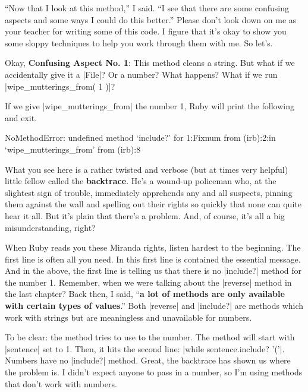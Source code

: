 \documentclass[12pt,twoside]{report}
\begin{document}
``Now that I look at this method,'' I said.  ``I see that there are
some confusing aspects and some ways I could do this better.''  Please
don't look down on me as your teacher for writing some of this code.
I figure that it's okay to show you some sloppy techniques to help you
work through them with me.  So let's.

Okay, {\bf Confusing Aspect No. 1}: This method cleans a string.  But
what if we accidentally give it a \rubyinline|File|?
Or a number?  What happens?  What if we run
\rubyinline|wipe_mutterings_from( 1 )|?

If we give \rubyinline|wipe_mutterings_from| the
number 1, Ruby will print the following and exit.


\begin{consolecode}

 NoMethodError: undefined method `include?' for 1:Fixnum
         from (irb):2:in `wipe_mutterings_from'
         from (irb):8

\end{consolecode}


What you see here is a rather twisted and verbose (but at times very
helpful) little fellow called the {\bf backtrace}.  He's a wound-up
policeman who, at the slightest sign of trouble, immediately
apprehends any and all suspects, pinning them against the wall and
spelling out their rights so quickly that none can quite hear it all.
But it's plain that there's a problem.  And, of course, it's all a big
misunderstanding, right?

When Ruby reads you these Miranda rights, listen hardest to the
beginning.  The first line is often all you need.  In this first line
is contained the essential message.  And in the above, the first line
is telling us that there is no \rubyinline|include?|
method for the number 1. Remember, when we were talking about the
\rubyinline|reverse| method in the last chapter?  Back
then, I said, ``{\bf a lot of methods are only available with certain
  types of values}.''  Both \rubyinline|reverse| and
\rubyinline|include?| are methods which work with
strings but are meaningless and unavailable for numbers.

To be clear: the method tries to use to the number.  The method will
start with \rubyinline|sentence| set to 1. Then, it
hits the second line: 
\rubyinline|while sentence.include? '('|.  
Numbers have no \rubyinline|include?| method.  Great,
the backtrace has shown us where the problem is.  I didn't expect
anyone to pass in a number, so I'm using methods that don't work with
numbers.
\end{document}
